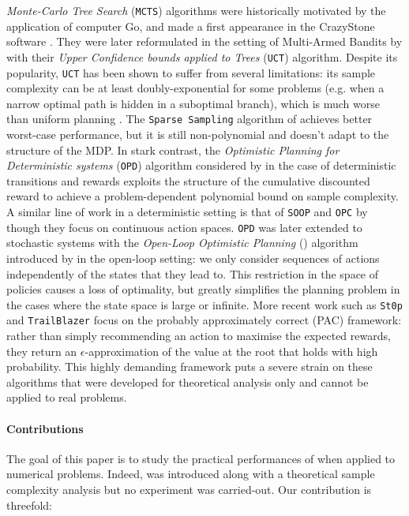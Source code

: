 \documentclass[runningheads]{llncs}
\newcommand{\citep}{\cite}
\newcommand{\citet}{\cite}
\begin{document}
\emph{Monte-Carlo Tree Search} (\texttt{MCTS}) algorithms were historically motivated by the application of computer Go, and made a first appearance in the CrazyStone software \citet{Coulom2006}. They were later reformulated in the setting of Multi-Armed Bandits by \citet{Kocsis2006} with their \emph{Upper Confidence bounds applied to Trees} (\texttt{UCT}) algorithm. Despite its popularity, \texttt{UCT} has been shown to suffer from several limitations: its sample complexity can be at least doubly-exponential for some problems (e.g. when a narrow optimal path is hidden in a suboptimal branch), which is much worse than uniform planning \citep{Coquelin2007}. The \texttt{Sparse Sampling} algorithm of \citet{Kearns2002} achieves better worst-case performance, but it is still non-polynomial and doesn't adapt to the structure of the MDP. In stark contrast, the \emph{Optimistic Planning for Deterministic systems} (\texttt{OPD}) algorithm considered by \citet{Hren2008} in the case of deterministic transitions and rewards exploits the structure of the cumulative discounted reward to achieve a problem-dependent polynomial bound on sample complexity. A similar line of work in a deterministic setting is that of \texttt{SOOP} and \texttt{OPC} by \cite{Busoniu2013,Busoniu2018} though they focus on continuous action spaces. \texttt{OPD} was later extended to stochastic systems with the \emph{Open-Loop Optimistic Planning} (\OLOP) algorithm introduced by \citet{Bubeck2010} in the open-loop setting: we only consider sequences of actions independently of the states that they lead to. This restriction in the space of policies causes a loss of optimality, but greatly simplifies the planning problem in the cases where the state space is large or infinite. More recent work such as \texttt{St0p} \citep{Szorenyi2014} and \texttt{TrailBlazer} \citep{Grill2016} focus on the probably approximately correct (PAC) framework: rather than simply recommending an action to maximise the expected rewards, they return an $\epsilon$-approximation of the value at the root that holds with high probability. This highly demanding framework puts a severe strain on these algorithms that were developed for theoretical analysis only and cannot be applied to real problems.

\paragraph{Contributions} The goal of this paper is to study the practical performances of \OLOP when applied to numerical problems. Indeed, \OLOP was introduced along with a theoretical sample complexity analysis but no experiment was carried-out. Our contribution is threefold:
\end{document}
